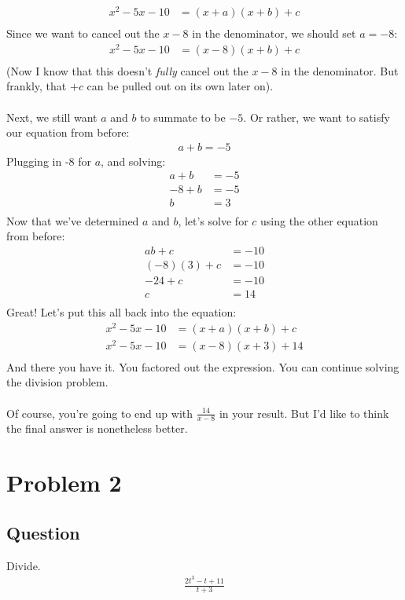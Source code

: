 \documentclass[12pt]{article}
\begin{document}
\begin{align*}
  x^2 - 5x -10 &= (x+a)(x+b)+c \\
\end{align*}
\newblock
Since we want to cancel out the $x-8$ in the denominator, we should set $a=-8$:
\begin{align*}
  x^2 - 5x -10 &= (x-8)(x+b)+c \\
\end{align*}
(Now I know that this doesn't \textit{fully} cancel out the $x-8$ in the denominator. 
But frankly, that $+c$ can be pulled out on its own later on).
\\ \\
Next, we still want $a$ and $b$ to summate to be $-5$. Or rather, we want to satisfy our equation from before:
\begin{align*}
  a+b = -5
\end{align*}
\newblock
Plugging in -8 for $a$, and solving:
\begin{align*}
  a+b &= -5 \\
  -8+b &= -5 \\
  b &= 3 \\
\end{align*}
Now that we've determined $a$ and $b$, let's solve for $c$ using the other equation from before:
\begin{align*}
  ab + c &= -10 \\
  (-8)(3) + c &= -10 \\
  -24 + c &= -10 \\
  c &= 14 \\
\end{align*}
Great! Let's put this all back into the equation:
\begin{align*}
  x^2 - 5x -10 &= (x+a)(x+b)+c \\
  x^2 - 5x -10 &= (x-8)(x+3)+14 \\
\end{align*}
And there you have it. You factored out the expression.
You can continue solving the division problem. 
\\ \\
Of course, you're going to end up with $\frac{14}{x-8}$ in your result. 
But I'd like to think the final answer is nonetheless better.
\section*{Problem 2}
\subsection*{Question}
Divide. \\
\begin{align*}
  \frac{2t^3-t+11}{t+3}
\end{align*}
\end{document}
